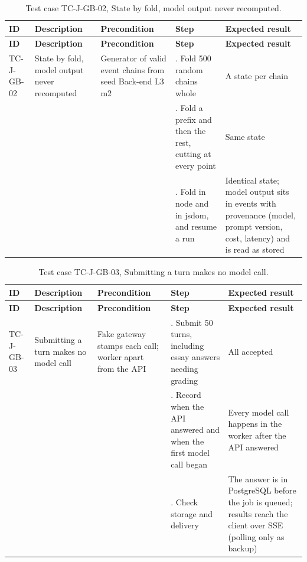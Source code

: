 {\small
\begin{longtable}{|>{\raggedright\arraybackslash}p{}|>{\raggedright\arraybackslash}p{}|>{\raggedright\arraybackslash}p{}|>{\raggedright\arraybackslash}p{}|>{\raggedright\arraybackslash}p{}|}
\caption{Test case TC-J-GB-02, State by fold, model output never recomputed.} \\
\hline
\textbf{ID} & \textbf{Description} & \textbf{Precondition} & \textbf{Step} & \textbf{Expected result} \\ \hline
\endfirsthead
\hline
\textbf{ID} & \textbf{Description} & \textbf{Precondition} & \textbf{Step} & \textbf{Expected result} \\ \hline
\endhead
TC-J-GB-02 & State by fold, model output never recomputed & Generator of valid event chains from seed Back-end L3 m2 & 1. Fold 500 random chains whole & A state per chain \\ \hline
 &  &  & 2. Fold a prefix and then the rest, cutting at every point & Same state \\ \hline
 &  &  & 3. Fold in node and in jsdom, and resume a run & Identical state; model output sits in events with provenance (model, prompt version, cost, latency) and is read as stored \\ \hline
\end{longtable}
}

{\small
\begin{longtable}{|>{\raggedright\arraybackslash}p{}|>{\raggedright\arraybackslash}p{}|>{\raggedright\arraybackslash}p{}|>{\raggedright\arraybackslash}p{}|>{\raggedright\arraybackslash}p{}|}
\caption{Test case TC-J-GB-03, Submitting a turn makes no model call.} \\
\hline
\textbf{ID} & \textbf{Description} & \textbf{Precondition} & \textbf{Step} & \textbf{Expected result} \\ \hline
\endfirsthead
\hline
\textbf{ID} & \textbf{Description} & \textbf{Precondition} & \textbf{Step} & \textbf{Expected result} \\ \hline
\endhead
TC-J-GB-03 & Submitting a turn makes no model call & Fake gateway stamps each call; worker apart from the API & 1. Submit 50 turns, including essay answers needing grading & All accepted \\ \hline
 &  &  & 2. Record when the API answered and when the first model call began & Every model call happens in the worker after the API answered \\ \hline
 &  &  & 3. Check storage and delivery & The answer is in PostgreSQL before the job is queued; results reach the client over SSE (polling only as backup) \\ \hline
\end{longtable}
}

